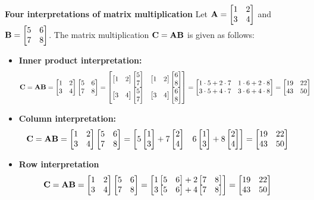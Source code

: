 \begin{boxedstuff}
    \begin{example}
        \textbf{Four interpretations of matrix multiplication} Let $\mf{A} = \bmx 1 & 2 \\ 3 & 4 \emx$ and $\mf{B} = \bmx 5 & 6 \\ 7 & 8 \emx$. The matrix multiplication $\mathbf{C} = \mathbf{A}\mathbf{B}$ is given as follows:
        \begin{itemize}
            \item \textbf{Inner product interpretation:}
            \[ \begin{split}
                \mf{C} &= \mf{A}\mf{B} = \bmxc 1 & 2 \\ 3 & 4 \emx \bmxc 5 & 6 \\ 7 & 8 \emx = \bmxc 
                \bmxc 1 & 2 \emx \bmx 5 \\ 7 \emx & \bmxc 1 & 2 \emx \bmx 6 \\ 8 \emx \\ 
                \bmxc 3 & 4 \emx \bmx 5 \\ 7 \emx & \bmxc 3 & 4 \emx \bmx 6 \\ 8 \emx \emx = \bmxc 1 \cdot 5 + 2 \cdot 7 & 1 \cdot 6 + 2 \cdot 8 \\ 3 \cdot 5 + 4 \cdot 7 & 3 \cdot 6 + 4 \cdot 8 \emx = \bmxc 19 & 22 \\ 43 & 50 \emx
            \end{split} \]
    
            \item \textbf{Column interpretation:}
            \[ \begin{split}
                \mf{C} &= \mf{A}\mf{B} = \bmxc 1 & 2 \\ 3 & 4 \emx \bmx 5 & 6 \\ 7 & 8 \emx = \bmx 
                5\bmx 1 \\ 3\emx + 7\bmx 2 \\ 4\emx & 6\bmx 1 \\ 3\emx + 8\bmx 2 \\ 4\emx \emx = \bmxc 19 & 22 \\ 43 & 50 \emx
            \end{split} \]
            
            \item \textbf{Row interpretation} 
            \[ \begin{split}
                \mf{C} &= \mf{A}\mf{B} = \bmxc 1 & 2 \\ 3 & 4 \emx \bmx 5 & 6 \\ 7 & 8 \emx = \bmx 
                1\bmx 5 & 6\emx + 2\bmx 7 & 8\emx \\ 
                3\bmx 5 & 6\emx + 4\bmx 7 & 8\emx \emx = \bmxc 19 & 22 \\ 43 & 50 \emx
            \end{split} \]
            

\end{itemize}
\end{example}
\end{boxedstuff}
